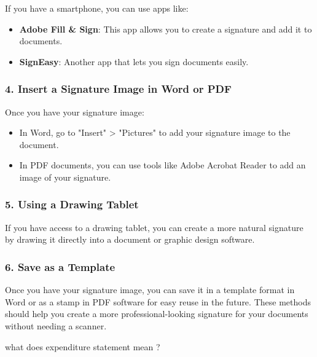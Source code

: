 \begin{botresponse}
If you have a smartphone, you can use apps like:

\begin{itemize}
\item \textbf{Adobe Fill \& Sign}: This app allows you to create a signature and add it to documents.
\item \textbf{SignEasy}: Another app that lets you sign documents easily.
\end{itemize}

\subsubsection{4. \textbf{Insert a Signature Image in Word or PDF}}

Once you have your signature image:

\begin{itemize}
\item In Word, go to "Insert" > "Pictures" to add your signature image to the document.
\item In PDF documents, you can use tools like Adobe Acrobat Reader to add an image of your signature.
\end{itemize}

\subsubsection{5. \textbf{Using a Drawing Tablet}}

If you have access to a drawing tablet, you can create a more natural signature by drawing it directly into a document or graphic design software.

\subsubsection{6. \textbf{Save as a Template}}

Once you have your signature image, you can save it in a template format in Word or as a stamp in PDF software for easy reuse in the future.
These methods should help you create a more professional-looking signature for your documents without needing a scanner.

\end{botresponse}

\begin{userprompt}

what does expenditure statement mean ?

\end{userprompt}

